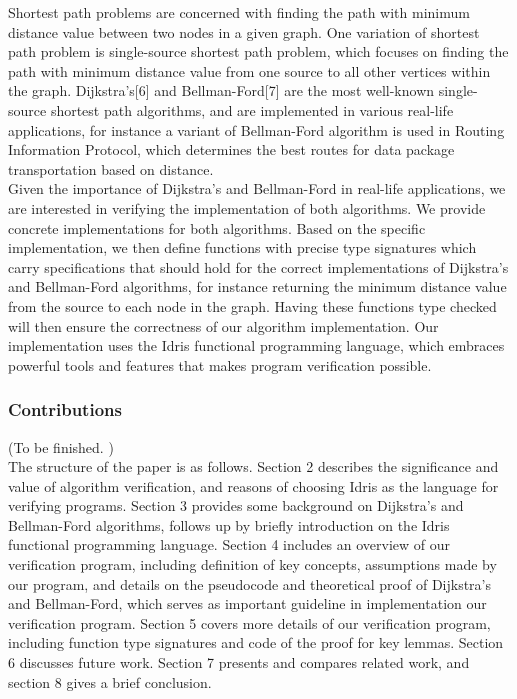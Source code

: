 
Shortest path problems are concerned with finding the path with minimum distance value between two nodes in a given graph. One variation of shortest path problem is single-source shortest path problem, which focuses on finding the path with minimum distance value from one source to all other vertices within the graph. Dijkstra's[6] and Bellman-Ford[7] are the most well-known single-source shortest path algorithms, and are implemented in various real-life applications, for instance a variant of Bellman-Ford algorithm is used in Routing Information Protocol, which determines the best routes for data package transportation based on distance. 
\\

Given the importance of Dijkstra's and Bellman-Ford in real-life applications, we are interested in verifying the implementation of both algorithms. We provide concrete implementations for both algorithms. Based on the specific implementation, we then define functions with precise type signatures which carry specifications that should hold for the correct implementations of Dijkstra's and Bellman-Ford algorithms, for instance returning the minimum distance value from the source to each node in the graph. Having these functions type checked will then ensure the correctness of our algorithm implementation. Our implementation uses the Idris functional programming language, which embraces powerful tools and features that makes program verification possible. 

\subsubsection*{Contributions}
(To be finished. )
\\

The structure of the paper is as follows. Section 2 describes the significance and value of algorithm verification, and reasons of choosing Idris as the language for verifying programs. Section 3 provides some background on Dijkstra's and Bellman-Ford algorithms, follows up by briefly introduction on the Idris functional programming language. Section 4 includes an overview of our verification program, including definition of key concepts, assumptions made by our program, and details on the pseudocode and theoretical proof of Dijkstra's and Bellman-Ford, which serves as important guideline in implementation our verification program. Section 5 covers more details of our verification program, including function type signatures and code of the proof for key lemmas. Section 6 discusses future work. Section 7 presents and compares related work, and section 8 gives a brief conclusion.  
